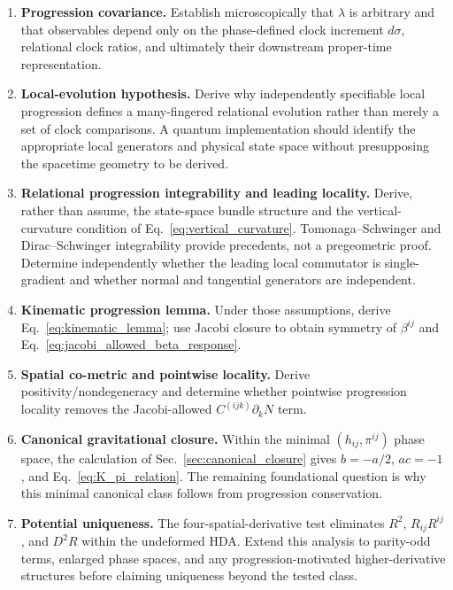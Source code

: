 \documentclass[11pt]{article}
\begin{document}
\begin{enumerate}[label=\textbf{Step \arabic*:},leftmargin=1.05in]
    \item \textbf{Progression covariance.} Establish microscopically that $\lambda$ is arbitrary and that observables depend only on the phase-defined clock increment $d\sigma$, relational clock ratios, and ultimately their downstream proper-time representation.

    \item \textbf{Local-evolution hypothesis.} Derive why independently specifiable local progression defines a many-fingered relational evolution rather than merely a set of clock comparisons. A quantum implementation should identify the appropriate local generators and physical state space without presupposing the spacetime geometry to be derived.

    \item \textbf{Relational progression integrability and leading locality.} Derive, rather than assume, the state-space bundle structure and the vertical-curvature condition of Eq.~\eqref{eq:vertical_curvature}. Tomonaga--Schwinger and Dirac--Schwinger integrability provide precedents, not a pregeometric proof. Determine independently whether the leading local commutator is single-gradient and whether normal and tangential generators are independent.

    \item \textbf{Kinematic progression lemma.} Under those assumptions, derive Eq.~\eqref{eq:kinematic_lemma}; use Jacobi closure to obtain symmetry of $\beta^{ij}$ and Eq.~\eqref{eq:jacobi_allowed_beta_response}.

    \item \textbf{Spatial co-metric and pointwise locality.} Derive positivity/nondegeneracy and determine whether pointwise progression locality removes the Jacobi-allowed $C^{(ijk)}\partial_kN$ term.

    \item \textbf{Canonical gravitational closure.} Within the minimal $(h_{ij},\pi^{ij})$ phase space, the calculation of Sec.~\ref{sec:canonical_closure} gives $b=-a/2$, $ac=-1$, and Eq.~\eqref{eq:K_pi_relation}. The remaining foundational question is why this minimal canonical class follows from progression conservation.

    \item \textbf{Potential uniqueness.} The four-spatial-derivative test eliminates $R^2$, $R_{ij}R^{ij}$, and $D^2R$ within the undeformed HDA. Extend this analysis to parity-odd terms, enlarged phase spaces, and any progression-motivated higher-derivative structures before claiming uniqueness beyond the tested class.


\end{enumerate}
\end{document}
